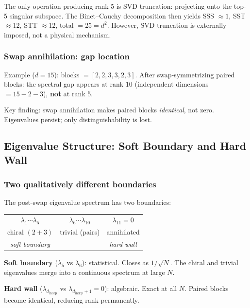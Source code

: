 \documentclass[12pt]{article}
\theoremstyle{remark}
\theoremstyle{definition}
\begin{document}
The only operation producing rank 5 is SVD truncation: projecting onto the top-5 singular subspace. The Binet--Cauchy decomposition then yields SSS $\approx 1$, SST $\approx 12$, STT $\approx 12$, total $= 25 = d^2$. However, SVD truncation is externally imposed, not a physical mechanism.

\subsubsection{Swap annihilation: gap location}

Example ($d=15$): blocks $= [2, 2, 3, 3, 2, 3]$. After swap-symmetrizing paired blocks: the spectral gap appears at rank $10$ (independent dimensions $= 15 - 2 - 3$), \textbf{not} at rank 5.

Key finding: swap annihilation makes paired blocks \emph{identical}, not zero. Eigenvalues persist; only distinguishability is lost.

\subsection{Eigenvalue Structure: Soft Boundary and Hard Wall}

\subsubsection{Two qualitatively different boundaries}

The post-swap eigenvalue spectrum has two boundaries:

\begin{center}
\begin{tabular}{ccc}
$\lambda_1 \cdots \lambda_5$ & $\lambda_6 \cdots \lambda_{10}$ & $\lambda_{11} = 0$ \\
chiral $(2+3)$ & trivial (pairs) & annihilated \\
\emph{soft boundary} & & \emph{hard wall} \\
\end{tabular}
\end{center}

\textbf{Soft boundary} ($\lambda_5$ vs $\lambda_6$): statistical. Closes as $1/\sqrt{N}$. The chiral and trivial eigenvalues merge into a continuous spectrum at large $N$.

\textbf{Hard wall} ($\lambda_{d_\text{indep}}$ vs $\lambda_{d_\text{indep}+1} = 0$): algebraic. Exact at all $N$. Paired blocks become identical, reducing rank permanently.
\end{document}

